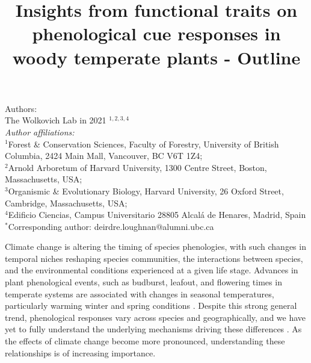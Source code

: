 \documentclass{article}\usepackage[]{graphicx}\usepackage[]{color}
\title{Insights from functional traits on phenological cue responses in woody temperate plants - Outline}
\begin{document}
\maketitle

\noindent Authors:\\
The Wolkovich Lab in 2021 $^{1,2,3,4}$
\vspace{2ex}\\
\emph{Author affiliations:}\\
$^{1}$Forest \& Conservation Sciences, Faculty of Forestry, University of British Columbia, 2424 Main Mall, Vancouver, BC V6T 1Z4;\\
$^{2}$Arnold Arboretum of Harvard University, 1300 Centre Street, Boston, Massachusetts, USA;\\
$^{3}$Organismic \& Evolutionary Biology, Harvard University, 26 Oxford Street, Cambridge, Massachusetts, USA;\\
$^{4}$Edificio Ciencias, Campus Universitario 28805 Alcalá de Henares, Madrid, Spain\\
 

\vspace{2ex}
$^*$Corresponding author: deirdre.loughnan@alumni.ubc.ca\\
\renewcommand{\thetable}{\arabic{table}}
\renewcommand{\thefigure}{\arabic{figure}}
\renewcommand{\labelitemi}{$-$}

Climate change is altering the timing of species phenologies, with such changes in temporal niches reshaping species communities, the interactions between species, and the environmental conditions experienced at a given life stage. Advances in plant phenological events, such as budburst, leafout, and flowering times in temperate systems are associated with changes in seasonal temperatures, particularly warming winter and spring conditions \citep{Miller-Rushing2008,Menzel2006,Fitter2002}. Despite this strong general trend, phenological responses vary across species and geographically, and we have yet to fully understand the underlying mechanisms driving these differences \citep{Chuine2010,Morin2009}. As the effects of climate change become more pronounced, understanding these relationships is of increasing importance. %
\end{document}

